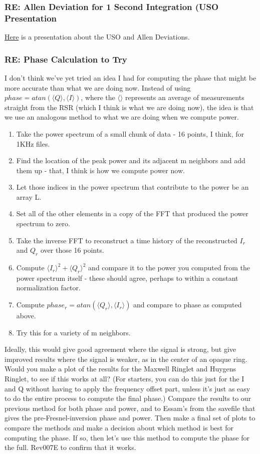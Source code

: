 \documentclass[crop=false,class=book]{standalone}
\begin{document}
\subsubsection{\footnotesize RE: Allen Deviation for 1 Second Integration (USO Presentation}
\href{https://websites.isae-supaero.fr/IMG/pdf/uso-toulouse.pdf}{Here} is a presentation about the USO and Allen Deviations.
\subsubsection{\footnotesize RE: Phase Calculation to Try}
I don't think we've yet tried an idea I had for computing the phase that might be more accurate than what we are doing now. Instead of using $phase = atan(\langle Q \rangle,\langle I \rangle)$, where the $\langle \rangle$ represents an average of measurements straight from the RSR (which I think is what we are doing now), the idea is that we use an analogous method to what we are doing when we compute power. 
\begin{enumerate}
    \item Take the power spectrum of a small chunk of data - 16 points, I think, for 1KHz files.
    \item Find the location of the peak power and its adjacent m neighbors and add them up - that, I think is how we compute power now.
    \item Let those indices in the power spectrum that contribute to the power be an array L.
    \item Set all of the other elements in a copy of the FFT that produced the power spectrum to zero.
    \item Take the inverse FFT to reconstruct a time history of the reconstructed $I_r$ and $Q_r$ over those 16 points.
    \item Compute $\langle I_r\rangle^2 + \langle Q_r\rangle^2$ and compare it to the power you computed from the power spectrum itself - these should agree, perhaps to within a constant normalization factor.
    \item Compute $phase_{r} = atan(\langle Q_r\rangle ,\langle I_r \rangle)$ and compare to phase as computed above. 
    \item Try this for a variety of m neighbors.
\end{enumerate}
Ideally, this would give good agreement where the signal is strong, but give improved results where the signal is weaker, as in the center of an opaque ring. Would you make a plot of the results for the Maxwell Ringlet and Huygens Ringlet, to see if this works at all? (For starters, you can do this just for the I and Q without having to apply the frequency offset part, unless it's just as easy to do the entire process to compute the final phase.) Compare the results to our previous method for both phase and power, and to Essam's from the savefile that gives the pre-Fresnel-inversion phase and power. Then make a final set of plots to compare the methods and make a decision about which method is best for computing the phase. If so, then let's use this method to compute the phase for the full. Rev007E to confirm that it works.
\end{document}
